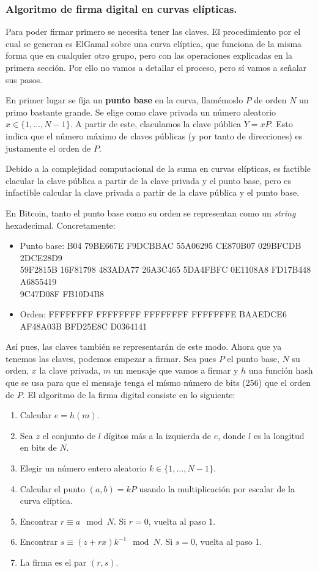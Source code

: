 \documentclass[twoside]{article}
\theoremstyle{definition}
\begin{document}
\subsubsection{Algoritmo de firma digital en curvas elípticas. }

Para poder firmar primero se necesita tener las claves. El procedimiento por el cual se generan es ElGamal sobre una curva elíptica, que funciona de la misma forma que en cualquier otro grupo, pero con las operaciones explicadas en la primera sección.  Por ello no vamos a detallar el proceso, pero sí vamos a señalar sus pasos. 

En primer lugar se fija un \textbf{punto base} en la curva, llamémoslo $P$ de orden $N$ un primo bastante grande. Se elige como clave privada un número aleatorio $x\in\{1,\dots, N-1\}$. A partir de este, claculamos la clave pública $Y=xP$. Esto indica que el número máximo de claves públicas (y por tanto de direcciones) es justamente el orden de $P$. 

Debido a la complejidad computacional de la suma en curvas elípticas, es factible clacular la clave pública a partir de la clave privada y el punto base, pero es infactible calcular la clave privada a partir de la clave pública y el punto base. 

En Bitcoin, tanto el punto base como su orden se representan como un \emph{string} hexadecimal. Concretamente:
\begin{itemize}
\item Punto base: B04 79BE667E F9DCBBAC 55A06295 CE870B07 029BFCDB 2DCE28D9 \\59F2815B 16F81798 483ADA77  26A3C465 5DA4FBFC 0E1108A8 FD17B448 A6855419 \\ 9C47D08F FB10D4B8
\item Orden:  FFFFFFFF FFFFFFFF FFFFFFFF FFFFFFFE BAAEDCE6 AF48A03B BFD25E8C D0364141
\end{itemize}

Así pues, las claves también se representarán de este modo. Ahora que ya tenemos las claves, podemos empezar a firmar. Sea pues $P$ el punto base, $N$ su orden, $x$ la clave privada, $m$ un mensaje que vamos a firmar y $h$ una función hash que se usa para que el mensaje tenga el mísmo número de bits (256) que el orden de $P$. El algoritmo de la firma digital consiste en lo siguiente:
\begin{enumerate}
\item Calcular $e=h(m)$.
\item Sea $z$ el conjunto de $l$ dígitos más a la izquierda de $e$, donde $l$ es la longitud en bits de $N$.
\item Elegir un número entero aleatorio $k\in\{1,\dots,N-1\}$.
\item Calcular el punto $(a,b)=kP$ usando la multiplicación por escalar de la curva elíptica. 
\item Encontrar $r\equiv a\mod N$. Si $r=0$, vuelta al paso 1.
\item Encontrar $s\equiv (z+rx)k^{-1}\mod N$. Si $s=0$, vuelta al paso 1. 
\item La firma es el par $(r,s)$. 
\end{enumerate}
\end{document}
